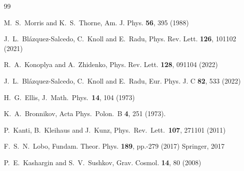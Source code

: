 \documentclass[floats,floatfix,showpacs,amssymb,prd,superscriptaddress,nofootinbib,nolongbibliography,reprint]{revtex4-2}
\begin{document}
\begin{thebibliography}{99}

M.~S.~Morris and K.~S.~Thorne,
Am. J. Phys. \textbf{56}, 395 (1988)

J.~L.~Bl\'azquez-Salcedo, C.~Knoll and E.~Radu,
Phys. Rev. Lett. \textbf{126}, 101102 (2021)

R.~A.~Konoplya and A.~Zhidenko,
Phys. Rev. Lett. \textbf{128}, 091104 (2022)

J.~L.~Bl{\'a}zquez-Salcedo, C.~Knoll and E.~Radu,
Eur. Phys. J. C \textbf{82}, 533 (2022)




  H.~G.~Ellis,
  J.\ Math.\ Phys.\  {\bf 14}, 104 (1973)

  K.~A.~Bronnikov,
  Acta Phys.\ Polon.\ B {\bf 4}, 251 (1973).

  P.~Kanti, B.~Kleihaus and J.~Kunz,
  Phys.\ Rev.\ Lett.\  {\bf 107}, 271101 (2011)

F.~S.~N.~Lobo,
Fundam. Theor. Phys. \textbf{189}, pp.-279 (2017)
Springer, 2017

P.~E.~Kashargin and S.~V.~Sushkov,
Grav. Cosmol. \textbf{14}, 80 (2008)


\end{thebibliography}
\end{document}
